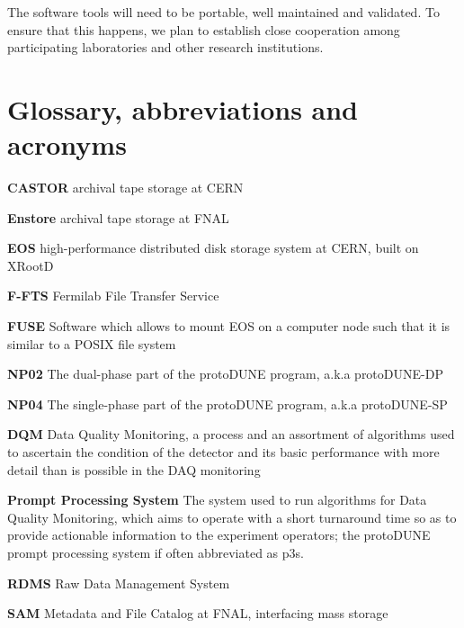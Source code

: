 \documentclass[12pt]{article}
\newcommand{\pd}{protoDUNE\xspace}
\begin{document}
The software tools will need to be portable, well maintained and validated. To ensure that this happens,
we plan to establish close cooperation among participating laboratories and other research institutions.


\newpage
\appendix
\section{Glossary, abbreviations and acronyms}
\label{sec:appendix-glossary}


\begin{description}

\item{\textbf{CASTOR}} archival tape storage at CERN

\item{\textbf{Enstore}} archival tape storage at FNAL

\item{\textbf{EOS}}  high-performance distributed disk storage system at CERN, built on XRootD

\item{\textbf{F-FTS}} Fermilab File Transfer Service

\item{\textbf{FUSE}} Software which allows to mount EOS on a computer node such that it is similar to a POSIX file system

\item{\textbf{NP02}} The dual-phase part of the \pd program, a.k.a \pd-DP

\item{\textbf{NP04}} The single-phase part of the \pd program, a.k.a \pd-SP

\item{\textbf{DQM}} Data Quality Monitoring, a process and an assortment of algorithms used to ascertain
the condition of the detector and its basic performance with more detail than is possible in the DAQ monitoring

\item{\textbf{Prompt Processing System}} The system used to run algorithms for Data Quality Monitoring, which
aims to operate with a short turnaround time so as to provide actionable information to the experiment operators;
the \pd prompt processing system if often abbreviated as p3s.

\item{\textbf{RDMS}} Raw Data Management System

\item{\textbf{SAM}} Metadata and File Catalog at FNAL, interfacing mass storage

\end{description}
\end{document}
